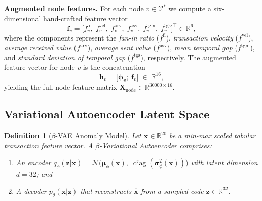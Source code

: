 \documentclass[journal]{IEEEtran}
\newtheorem{definition}{Definition}
\begin{document}
\noindent\textbf{Augmented node features.}
For each node $v\in\mathcal{V}^{*}$ we compute a six-dimensional hand-crafted
feature vector
\begin{equation}
  \mathbf{f}_{v}
    = \bigl[
        f^{\mathrm{fi}}_v,\;
        f^{\mathrm{vel}}_v,\;
        f^{\mathrm{arv}}_v,\;
        f^{\mathrm{asv}}_v,\;
        f^{\mathrm{tgm}}_v,\;
        f^{\mathrm{tgs}}_v
      \bigr]^{\!\top} \in \mathbb{R}^{6},
  \label{eq:fv}
\end{equation}
where the components represent the \emph{fan-in ratio}
($f^{\mathrm{fi}}$), \emph{transaction velocity}
($f^{\mathrm{vel}}$), \emph{average received value}
($f^{\mathrm{arv}}$), \emph{average sent value}
($f^{\mathrm{asv}}$), \emph{mean temporal gap}
($f^{\mathrm{tgm}}$), and \emph{standard deviation of temporal gap}
($f^{\mathrm{tgs}}$), respectively.
The augmented feature vector for node $v$ is the concatenation
\begin{equation}
  \mathbf{h}_{v}
    = \bigl[\boldsymbol{\phi}_{v};\; \mathbf{f}_{v}\bigr]
    \;\in\; \mathbb{R}^{16},
  \label{eq:hv}
\end{equation}
yielding the full node feature matrix
$\mathbf{X}_{\mathrm{node}}\in\mathbb{R}^{\num{30000}\times 16}$.

\subsection{Variational Autoencoder Latent Space}
\label{subsec:vae}

\begin{definition}[$\beta$-VAE Anomaly Model]
\label{def:vae}
Let $\mathbf{x}\in\mathbb{R}^{20}$ be a min-max scaled tabular transaction
feature vector.  A $\beta$-Variational Autoencoder comprises:
\begin{enumerate}
  \item An \emph{encoder} $q_{\phi}(\mathbf{z}|\mathbf{x}) =
        \mathcal{N}\!\bigl(\boldsymbol{\mu}_{\phi}(\mathbf{x}),\;
        \operatorname{diag}(\boldsymbol{\sigma}^{2}_{\phi}(\mathbf{x}))\bigr)$
        with latent dimension $d=32$; and
  \item A \emph{decoder} $p_{\theta}(\mathbf{x}|\mathbf{z})$ that
        reconstructs $\hat{\mathbf{x}}$ from a sampled code
        $\mathbf{z}\in\mathbb{R}^{32}$.
\end{enumerate}
\end{definition}
\end{document}
